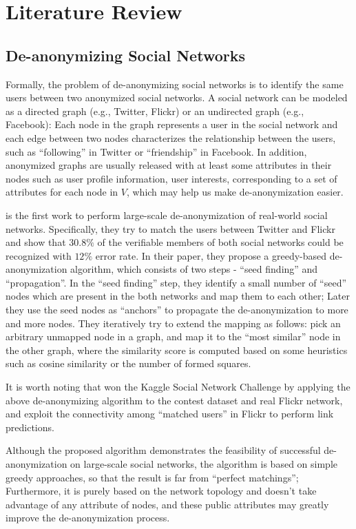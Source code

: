 \documentclass[11pt,letterpaper]{article}
\begin{document}
\section{Literature Review}

\subsection{De-anonymizing Social Networks}

Formally, the problem of de-anonymizing social networks is to identify the same users between two anonymized social networks.  A social network can be modeled as a directed graph (e.g., Twitter, Flickr) or an undirected graph (e.g., Facebook): Each node in the graph represents a user in the social network and each edge between two nodes characterizes the relationship between the users, such as ``following'' in Twitter or ``friendship'' in Facebook. In addition, anonymized graphs are usually released with at least some attributes in their nodes such as user profile information, user interests, corresponding to a set of attributes for each node in $V$, which may help us make de-anonymization easier.

\cite{Narayanan2009} is the first work to perform large-scale de-anonymization of real-world social networks. Specifically, they try to match the users between Twitter and Flickr and show that $30.8\%$ of the verifiable members of both social networks could be recognized with $12\%$ error rate. In their paper, they propose a greedy-based de-anonymization algorithm, which consists of two steps - ``seed finding'' and ``propagation''. In the ``seed finding'' step, they identify a small number of ``seed'' nodes which are present in the both networks and map them to each other; Later they use the seed nodes as ``anchors'' to propagate the de-anonymization to more and more nodes. They iteratively try to extend the mapping as follows: pick an arbitrary unmapped node in a graph, and map it to the ``most similar'' node in the other graph, where the similarity score is computed based on some heuristics such as cosine similarity or the number of formed squares.

It is worth noting that \cite{Narayanan2011} won the Kaggle Social Network Challenge by applying the above de-anonymizing algorithm to the contest dataset and real Flickr network, and exploit the connectivity among ``matched users'' in Flickr to perform link predictions. 

Although the proposed algorithm demonstrates the feasibility of successful de-anonymization on large-scale social networks, the algorithm is based on simple greedy approaches, so that the result is far from ``perfect matchings''; Furthermore, it is purely based on the network topology and doesn't take advantage of any attribute of nodes, and these public attributes may greatly improve the de-anonymization process.
\end{document}
